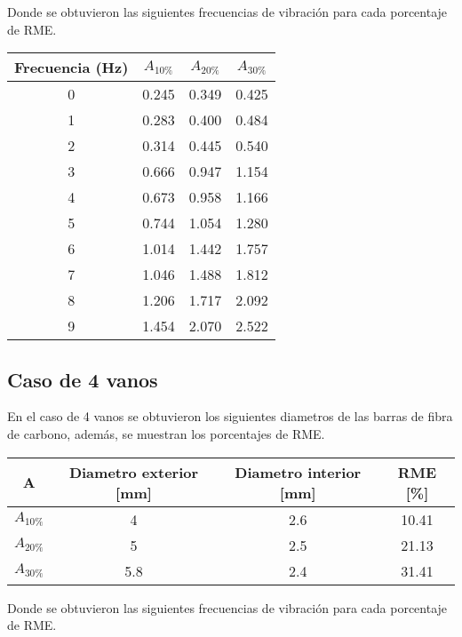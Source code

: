 Donde se obtuvieron las siguientes frecuencias de vibración para cada porcentaje de RME.

\begin{table}[H]
    \centering
    \begin{tabular}{cccc}
    \toprule
     Frecuencia (Hz) & $A_{10\%}$ & $A_{20\%}$ & $A_{30\%}$ \\
    \midrule
     0 &  0.245 &  0.349 &  0.425 \\
     1 &  0.283 &  0.400 &  0.484 \\
     2 &  0.314 &  0.445 &  0.540 \\
     3 &  0.666 &  0.947 &  1.154 \\
     4 &  0.673 &  0.958 &  1.166 \\
     5 &  0.744 &  1.054 &  1.280 \\
     6 &  1.014 &  1.442 &  1.757 \\
     7 &  1.046 &  1.488 &  1.812 \\
     8 &  1.206 &  1.717 &  2.092 \\
     9 &  1.454 &  2.070 &  2.522 \\
    \bottomrule
    \end{tabular}
\end{table}

\subsection{Caso de 4 vanos}
En el caso de 4 vanos se obtuvieron los siguientes diametros de las barras de fibra de carbono, además, se muestran los porcentajes de RME.

\begin{table}[H]
    \centering
    \begin{tabular}{cccc}
    \toprule
     A & Diametro exterior [mm] & Diametro interior [mm] & RME [\%] \\
    \midrule
     $A_{10\%}$ &  4 &  2.6 &  10.41 \\
     $A_{20\%}$ &  5 &  2.5 &  21.13 \\
     $A_{30\%}$ &  5.8 &  2.4 &  31.41 \\
    \bottomrule
    \end{tabular}
\end{table}

Donde se obtuvieron las siguientes frecuencias de vibración para cada porcentaje de RME.

